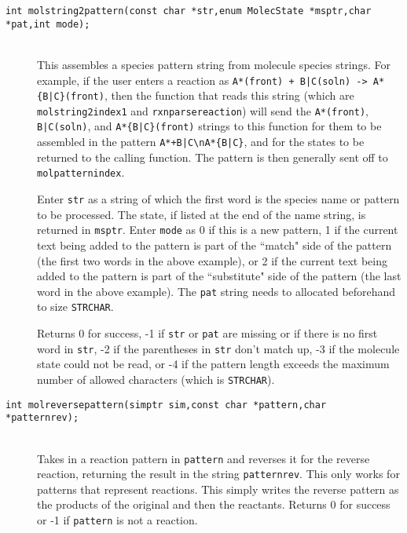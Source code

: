 \documentclass {book}
\begin{document}
\begin{description}
\item[\texttt{int molstring2pattern(const char *str,enum MolecState *msptr,char *pat,int mode);}]
\hfill \\
This assembles a species pattern string from molecule species strings.  For example, if the user enters a reaction as \texttt{A*(front) + B|C(soln) -> A*\{B|C\}(front)}, then the function that reads this string (which are \texttt{molstring2index1} and \texttt{rxnparsereaction}) will send the \texttt{A*(front)}, \texttt{B|C(soln)}, and \texttt{A*\{B|C\}(front)} strings to this function for them to be assembled in the pattern \texttt{A*+B|C\textbackslash nA*\{B|C\}}, and for the states to be returned to the calling function.  The pattern is then generally sent off to \texttt{molpatternindex}.

Enter \texttt{str} as a string of which the first word is the species name or pattern to be processed.  The state, if listed at the end of the name string, is returned in \texttt{msptr}.  Enter \texttt{mode} as 0 if this is a new pattern, 1 if the current text being added to the pattern is part of the ``match" side of the pattern (the first two words in the above example), or 2 if the current text being added to the pattern is part of the ``substitute" side of the pattern (the last word in the above example).  The \texttt{pat} string needs to allocated beforehand to size \texttt{STRCHAR}.

Returns 0 for success, -1 if \texttt{str} or \texttt{pat} are missing or if there is no first word in \texttt{str}, -2 if the parentheses in \texttt{str} don't match up, -3 if the molecule state could not be read, or -4 if the pattern length exceeds the maximum number of allowed characters (which is \texttt{STRCHAR}).

\item[\texttt{int molreversepattern(simptr sim,const char *pattern,char *patternrev);}]
\hfill \\
Takes in a reaction pattern in \texttt{pattern} and reverses it for the reverse reaction, returning the result in the string \texttt{patternrev}.  This only works for patterns that represent reactions.  This simply writes the reverse pattern as the products of the original and then the reactants.  Returns 0 for success or -1 if \texttt{pattern} is not a reaction.


\end{description}
\end{document}

